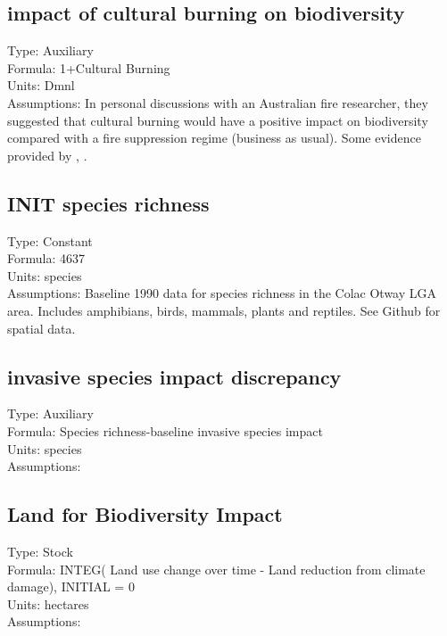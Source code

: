 \documentclass[
  11pt,
]{book}
\begin{document}
\hypertarget{impact-of-cultural-burning-on-biodiversity}{%
\subsection{impact of cultural burning on biodiversity}\label{impact-of-cultural-burning-on-biodiversity}}

Type: Auxiliary\\
Formula: 1+Cultural Burning\\
Units: Dmnl\\
Assumptions: In personal discussions with an Australian fire researcher, they suggested that cultural burning would have a positive impact on biodiversity compared with a fire suppression regime (business as usual). Some evidence provided by \citet{bowman_human_2011}, \citet{trauernicht_local_2015}.

\hypertarget{init-species-richness}{%
\subsection{INIT species richness}\label{init-species-richness}}

Type: Constant\\
Formula: 4637\\
Units: species\\
Assumptions: Baseline 1990 data for species richness in the Colac Otway LGA area. Includes amphibians, birds, mammals, plants and reptiles. See Github for spatial data.

\hypertarget{invasive-species-impact-discrepancy}{%
\subsection{invasive species impact discrepancy}\label{invasive-species-impact-discrepancy}}

Type: Auxiliary\\
Formula: Species richness-baseline invasive species impact\\
Units: species\\
Assumptions:

\hypertarget{land-for-biodiversity-impact}{%
\subsection{Land for Biodiversity Impact}\label{land-for-biodiversity-impact}}

Type: Stock\\
Formula: INTEG( Land use change over time - Land reduction from climate damage), INITIAL = 0\\
Units: hectares\\
Assumptions:
\end{document}
